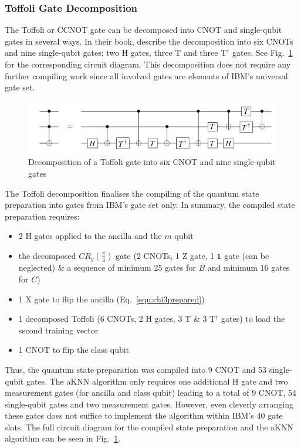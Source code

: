 \subsubsection{Toffoli Gate Decomposition}
\label{subsubsubsec:toffoli}

The Toffoli or CCNOT gate can be decomposed into CNOT and single-qubit gates in several ways. In their book,  describe the decomposition into six CNOTs and nine single-qubit gates; two H gates, three T and three T$^\dagger$ gates. See Fig.~\ref{img:toffolidecomp} for the corresponding circuit diagram. This decomposition does not require any further compiling work since all involved gates are elements of IBM's universal gate set.

\begin{figure}[!ht]
       \centering
       \includegraphics[scale=0.4]{img/toffolidecomposition.png}
       \caption[]{\label{img:toffolidecomp} Decomposition of a Toffoli gate into six CNOT and nine single-qubit gates\footnotemark[17]}
\end{figure}

The Toffoli decomposition finalises the compiling of the quantum state preparation into gates from IBM's gate set only. In summary, the compiled state preparation requires: 
\begin{itemize}
\item 2 H gates applied to the ancilla and the $m$ qubit
\item the decomposed $CR_y(\frac{\pi}{4})$ gate (2 CNOTs, 1 Z gate, 1 $\mathbb{1}$ gate (can be neglected) \& a sequence of minimum 25 gates for $B$ and minimum 16 gates for $C$)
\item 1 X gate to flip the ancilla (Eq.~\ref{equ:chi3prepared})
\item 1 decomposed Toffoli (6 CNOTs, 2 H gates, 3 T \& 3 T$^\dagger$ gates) to load the second training vector
\item 1 CNOT to flip the class qubit
\end{itemize}
Thus, the quantum state preparation was compiled into 9 CNOT and 53 single-qubit gates. The aKNN algorithm only requires one additional H gate and two measurement gates (for ancilla and class qubit) leading to a total of 9 CNOT, 54 single-qubit gates and two measurement gates. However, even cleverly arranging these gates does not suffice to implement the algorithm within IBM's 40 gate slots. The full circuit diagram for the compiled state preparation and the aKNN algorithm can be seen in Fig.~\ref{img:toffolidecomp}.

